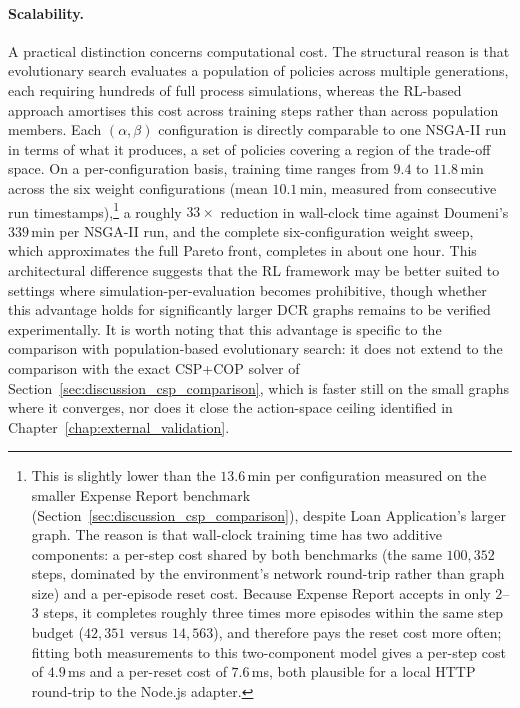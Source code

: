 \paragraph{Scalability.} A practical distinction concerns computational cost. The structural reason is that evolutionary search evaluates a population of policies across multiple generations, each requiring hundreds of full process simulations, whereas the \ac{RL}-based approach amortises this cost across training steps rather than across population members. Each $(\alpha,\beta)$ configuration is directly comparable to one NSGA-II run in terms of what it produces, a set of policies covering a region of the trade-off space. On a per-configuration basis, training time ranges from $9.4$ to $11.8$\,min across the six weight configurations (mean $10.1$\,min, measured from consecutive run timestamps),\footnote{This is slightly lower than the $13.6$\,min per configuration measured on the smaller Expense Report benchmark (Section~\ref{sec:discussion_csp_comparison}), despite Loan Application's larger graph. The reason is that wall-clock training time has two additive components: a per-step cost shared by both benchmarks (the same $100{,}352$ steps, dominated by the environment's network round-trip rather than graph size) and a per-episode reset cost. Because Expense Report accepts in only $2$--$3$ steps, it completes roughly three times more episodes within the same step budget ($42{,}351$ versus $14{,}563$), and therefore pays the reset cost more often; fitting both measurements to this two-component model gives a per-step cost of $4.9$\,ms and a per-reset cost of $7.6$\,ms, both plausible for a local HTTP round-trip to the Node.js adapter.} a roughly $33\times$ reduction in wall-clock time against Doumeni's $339$\,min per NSGA-II run, and the complete six-configuration weight sweep, which approximates the full Pareto front, completes in about one hour. This architectural difference suggests that the \ac{RL} framework may be better suited to settings where simulation-per-evaluation becomes prohibitive, though whether this advantage holds for significantly larger \ac{DCR} graphs remains to be verified experimentally. It is worth noting that this advantage is specific to the comparison with population-based evolutionary search: it does not extend to the comparison with the exact CSP+COP solver of Section~\ref{sec:discussion_csp_comparison}, which is faster still on the small graphs where it converges, nor does it close the action-space ceiling identified in Chapter~\ref{chap:external_validation}.

